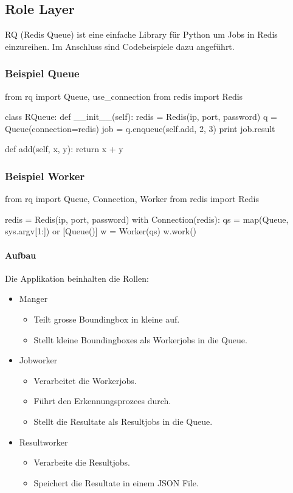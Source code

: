 
\subsection{Role Layer}

\Gls{RQ} \cite{RQ} (Redis Queue) ist eine einfache Library für Python um Jobs in Redis einzureihen. Im Anschluss sind Codebeispiele dazu angeführt.

\subsubsection{Beispiel Queue}
\begin{python}
from rq import Queue, use_connection
from redis import Redis

class RQueue:
   def __init__(self):
       redis = Redis(ip, port, password)
       q = Queue(connection=redis)
       job = q.enqueue(self.add, 2, 3)
       print job.result

   def add(self, x, y):
       return x + y
\end{python}

\subsubsection{Beispiel Worker}
\begin{python}
from rq import Queue, Connection, Worker
from redis import Redis

redis = Redis(ip, port, password)
with Connection(redis):
   qs = map(Queue, sys.argv[1:]) or [Queue()]
   w = Worker(qs)
   w.work()
\end{python}

\paragraph{Aufbau} Die Applikation beinhalten die Rollen:
\begin{itemize}
	\item Manger
	\begin{itemize}
		\item Teilt grosse Boundingbox in kleine auf.
		\item Stellt kleine Boundingboxes als Workerjobs in die Queue.
	\end{itemize}
		\item Jobworker
	\begin{itemize}
		\item Verarbeitet die Workerjobs.
		\item Führt den Erkennungsprozees durch.
		\item Stellt die Resultate als Resultjobs in die Queue.
	\end{itemize}
		\item Resultworker
	\begin{itemize}
		\item Verarbeite die Resultjobs.
		\item Speichert die Resultate in einem JSON File.
	\end{itemize}
\end{itemize}


\newpage
